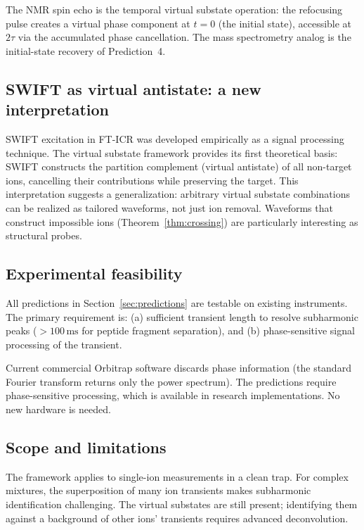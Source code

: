 \documentclass[twocolumn,10pt,a4paper]{article}
\theoremstyle{thmstyle}
\theoremstyle{definition}
\theoremstyle{remark}
\begin{document}
The NMR spin echo \citep{hahn1950} is the temporal virtual substate
operation: the refocusing pulse creates a virtual phase component at
$t = 0$ (the initial state), accessible at $2\tau$ via the accumulated
phase cancellation. The mass spectrometry analog is the initial-state
recovery of Prediction~4.

\subsection{SWIFT as virtual antistate: a new interpretation}

SWIFT excitation in FT-ICR \citep{swift1985} was developed empirically
as a signal processing technique. The virtual substate framework
provides its first theoretical basis: SWIFT constructs the partition
complement (virtual antistate) of all non-target ions, cancelling their
contributions while preserving the target. This interpretation suggests
a generalization: arbitrary virtual substate combinations can be realized
as tailored waveforms, not just ion removal. Waveforms that construct
impossible ions (Theorem~\ref{thm:crossing}) are particularly interesting
as structural probes.

\subsection{Experimental feasibility}

All predictions in Section~\ref{sec:predictions} are testable on
existing instruments. The primary requirement is:
(a) sufficient transient length to resolve subharmonic peaks
($>100\,\mathrm{ms}$ for peptide fragment separation), and
(b) phase-sensitive signal processing of the transient.

Current commercial Orbitrap software discards phase information
(the standard Fourier transform returns only the power spectrum). The
predictions require phase-sensitive processing, which is available in
research implementations. No new hardware is needed.

\subsection{Scope and limitations}

The framework applies to single-ion measurements in a clean trap.
For complex mixtures, the superposition of many ion transients makes
subharmonic identification challenging. The virtual substates are still
present; identifying them against a background of other ions' transients
requires advanced deconvolution.
\end{document}
